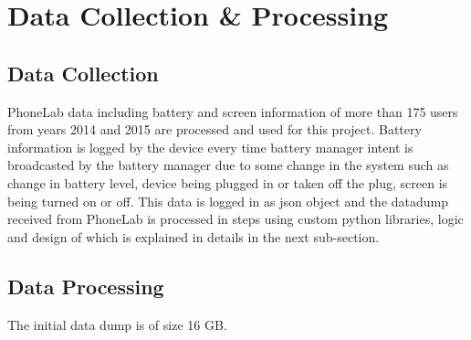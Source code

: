 \section*{Data Collection & Processing}

\subsection*{Data Collection}
PhoneLab data including battery and screen information of more than 175 users from years 2014 and 2015
are processed and used for this project. Battery information is logged by the device every time battery
manager intent is broadcasted by the battery manager due to some change in the system such as change in
battery level, device being plugged in or taken off the plug, screen is being turned on or off. This data
is logged in as json object and the datadump received from PhoneLab is processed in steps using custom python
libraries, logic and design of which is explained in details in the next sub-section.


\subsection*{Data Processing}
The initial data dump is of size 16 GB. 
